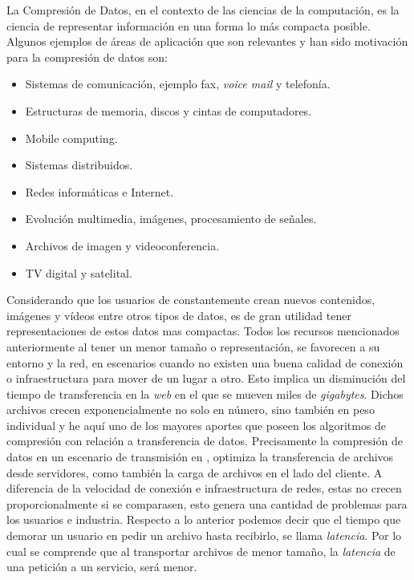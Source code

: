 
 
La Compresión de Datos, en el contexto de las ciencias de la computación, es la ciencia  de representar información en una forma lo más compacta posible. Algunos ejemplos de áreas de aplicación que son relevantes y han sido motivación para la compresión de datos son:

\begin{itemize}
	\menorEspacioItemize

	\item Sistemas de comunicación, ejemplo fax, \emph{voice mail} y telefonía.
	\item Estructuras de memoria, discos y cintas de computadores.
	\item Mobile computing.
	\item Sistemas distribuidos.
	\item Redes informáticas e Internet.
	\item Evolución multimedia, imágenes, procesamiento de señales.
	\item Archivos de imagen y videoconferencia.
	\item TV digital y satelital.

\end{itemize}


Considerando que los usuarios de \inet constantemente  crean nuevos contenidos, imágenes y vídeos  entre otros tipos de datos, es de gran utilidad tener representaciones de estos datos mas compactas. Todos los recursos mencionados anteriormente al tener un menor tamaño o representación, se favorecen a su entorno y la red, en escenarios cuando no existen una buena calidad de conexión o infraestructura para mover de un lugar a otro. Esto implica un disminución del tiempo de transferencia en la \emph{web} en el que se mueven miles de \emph{gigabytes}. Dichos archivos crecen exponencialmente no solo en número, sino también en peso individual y he aquí uno de los mayores aportes que poseen los algoritmos de compresión con relación a transferencia de datos. Precisamente la compresión de datos en un escenario de transmisión en \inet, optimiza la transferencia de archivos desde servidores, como también la carga de archivos en el lado del cliente. A diferencia de la velocidad de conexión e infraestructura de redes, estas no crecen proporcionalmente si se comparasen, esto genera una cantidad de problemas para los usuarios e industria. Respecto a lo anterior podemos decir que el tiempo que demorar un usuario en pedir un archivo hasta recibirlo, se llama \emph{latencia}. Por lo cual se comprende que al transportar archivos de menor tamaño, la \emph{latencia} de una petición a un servicio, será menor.


